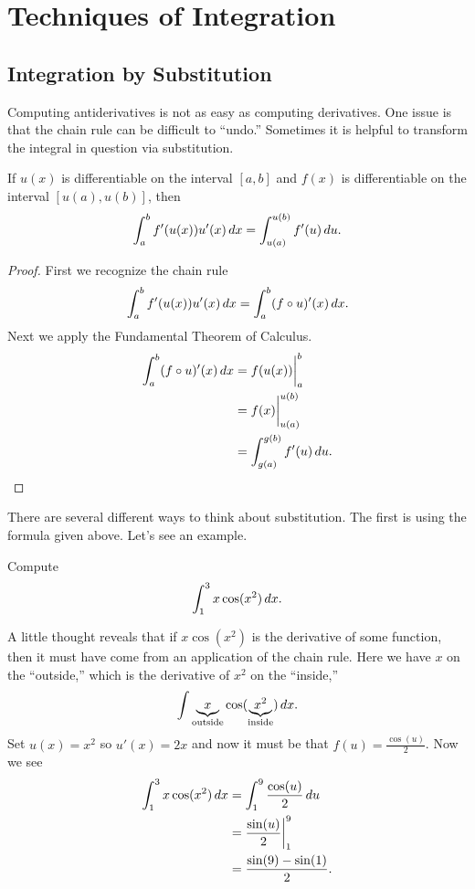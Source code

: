 \chapter{Techniques of Integration}


\section{Integration by Substitution}

Computing antiderivatives is not as easy as computing derivatives. One
issue is that the chain rule can be difficult to ``undo.'' Sometimes 
it is helpful to transform the integral in question via substitution. 

\begin{mainTheorem} 
If $u(x)$ is differentiable on the interval $[a,b]$ and $f(x)$ is
differentiable on the interval $[u(a),u(b)]$, then
\[
\int_a^b f'(u(x)) u'(x) \, d x =\int_{u(a)}^{u(b)} f'(u) \, d u.
\]
\end{mainTheorem}
\begin{proof} First we recognize the chain rule
\[
\int_a^b f'(u(x)) u'(x) \, d x = \int_a^b (f\circ u)'(x) \, d x.
\]
Next we apply the Fundamental Theorem of Calculus. 
\begin{align*} 
\int_a^b (f\circ u)'(x) \, d x &= f(u(x)) \bigg|_a^b \\
&= f(x) \bigg|_{u(a)}^{u(b)}\\ 
&= \int_{g(a)}^{g(b)} f'(u) \, d u.
\end{align*}
\end{proof}


There are several different ways to think about substitution. The
first is using the formula given above. Let's see an example. 
\begin{example}
Compute
\[
\int_1^3 x\cos(x^2)\, d x.
\]
\end{example}


\begin{solution}
A little thought reveals that if $x\cos(x^2)$ is the derivative of
some function, then it must have come from an application of the chain
rule. Here we have $x$ on the ``outside,'' which is the derivative of
$x^2$ on the ``inside,'' 
\[
\int \underbrace{x}_{\text{outside}}\cos(\underbrace{x^2}_{\text{inside}})\, d x.
\]
Set $u(x) = x^2$ so $u'(x) = 2x$ and now it must be that $f(u) =
\frac{\cos(u)}{2}$. Now we see
\begin{align*}
\int_1^3 x\cos(x^2)\, d x &= \int_1^9 \frac{\cos(u)}{2}\, d u\\
&= \frac{\sin(u)}{2} \bigg|_1^9 \\
&= \frac{\sin(9) -\sin(1)}{2}.
\end{align*}
\end{solution}

